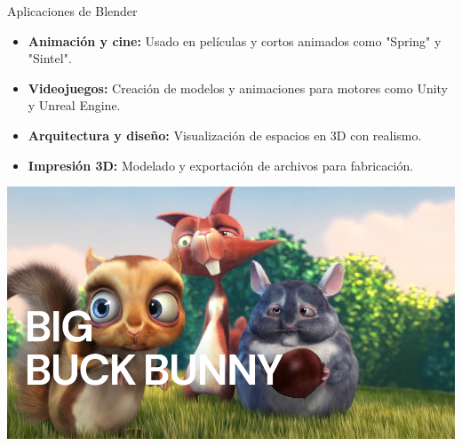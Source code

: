 \begin{frame}{Aplicaciones de Blender}
    \begin{itemize}
        \item \textbf{Animación y cine:} Usado en películas y cortos animados como "Spring" y "Sintel".
        \item \textbf{Videojuegos:} Creación de modelos y animaciones para motores como Unity y Unreal Engine.
        \item \textbf{Arquitectura y diseño:} Visualización de espacios en 3D con realismo.
        \item \textbf{Impresión 3D:} Modelado y exportación de archivos para fabricación.
    \end{itemize}
    \begin{center}
        \includegraphics[width=0.6\linewidth]{BigBuckBunny.png}
    \end{center}
\end{frame}
